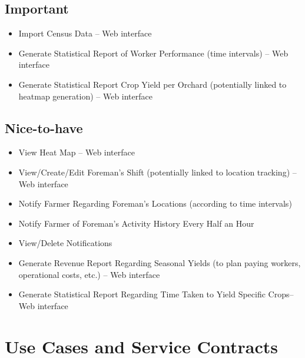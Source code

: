 \documentclass[11pt,fleqn]{book} %
\begin{document}
	\section{Important}
	\begin{itemize}
		\item Import Census Data – Web interface
		\item Generate Statistical Report of Worker Performance (time intervals) – Web interface
		\item Generate Statistical Report Crop Yield per Orchard (potentially linked to heatmap generation) – Web interface				
	\end{itemize}
	\section{Nice-to-have}
	\begin{itemize}
		\item View Heat Map – Web interface
		\item View/Create/Edit Foreman’s Shift (potentially linked to location tracking)  – Web interface
		\item Notify Farmer Regarding Foreman’s Locations (according to time intervals)
		\item Notify Farmer of Foreman’s Activity History Every Half an Hour
		\item View/Delete Notifications
		\item Generate Revenue Report Regarding Seasonal Yields (to plan paying workers, operational costs, etc.) – Web interface
		\item Generate Statistical Report Regarding Time Taken to Yield Specific Crops– Web interface
	\end{itemize}
	


\chapter{Use Cases and Service Contracts}
\end{document}
